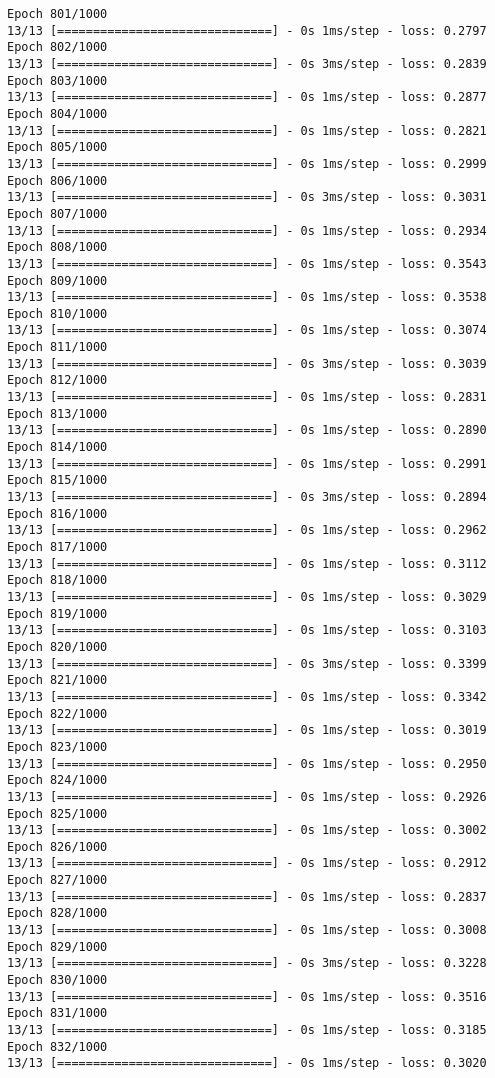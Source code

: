 \documentclass[11pt]{article}
\begin{document}
\begin{Verbatim}[commandchars=\\\{\}]
Epoch 801/1000
13/13 [==============================] - 0s 1ms/step - loss: 0.2797
Epoch 802/1000
13/13 [==============================] - 0s 3ms/step - loss: 0.2839
Epoch 803/1000
13/13 [==============================] - 0s 1ms/step - loss: 0.2877
Epoch 804/1000
13/13 [==============================] - 0s 1ms/step - loss: 0.2821
Epoch 805/1000
13/13 [==============================] - 0s 1ms/step - loss: 0.2999
Epoch 806/1000
13/13 [==============================] - 0s 3ms/step - loss: 0.3031
Epoch 807/1000
13/13 [==============================] - 0s 1ms/step - loss: 0.2934
Epoch 808/1000
13/13 [==============================] - 0s 1ms/step - loss: 0.3543
Epoch 809/1000
13/13 [==============================] - 0s 1ms/step - loss: 0.3538
Epoch 810/1000
13/13 [==============================] - 0s 1ms/step - loss: 0.3074
Epoch 811/1000
13/13 [==============================] - 0s 3ms/step - loss: 0.3039
Epoch 812/1000
13/13 [==============================] - 0s 1ms/step - loss: 0.2831
Epoch 813/1000
13/13 [==============================] - 0s 1ms/step - loss: 0.2890
Epoch 814/1000
13/13 [==============================] - 0s 1ms/step - loss: 0.2991
Epoch 815/1000
13/13 [==============================] - 0s 3ms/step - loss: 0.2894
Epoch 816/1000
13/13 [==============================] - 0s 1ms/step - loss: 0.2962
Epoch 817/1000
13/13 [==============================] - 0s 1ms/step - loss: 0.3112
Epoch 818/1000
13/13 [==============================] - 0s 1ms/step - loss: 0.3029
Epoch 819/1000
13/13 [==============================] - 0s 1ms/step - loss: 0.3103
Epoch 820/1000
13/13 [==============================] - 0s 3ms/step - loss: 0.3399
Epoch 821/1000
13/13 [==============================] - 0s 1ms/step - loss: 0.3342
Epoch 822/1000
13/13 [==============================] - 0s 1ms/step - loss: 0.3019
Epoch 823/1000
13/13 [==============================] - 0s 1ms/step - loss: 0.2950
Epoch 824/1000
13/13 [==============================] - 0s 1ms/step - loss: 0.2926
Epoch 825/1000
13/13 [==============================] - 0s 1ms/step - loss: 0.3002
Epoch 826/1000
13/13 [==============================] - 0s 1ms/step - loss: 0.2912
Epoch 827/1000
13/13 [==============================] - 0s 1ms/step - loss: 0.2837
Epoch 828/1000
13/13 [==============================] - 0s 1ms/step - loss: 0.3008
Epoch 829/1000
13/13 [==============================] - 0s 3ms/step - loss: 0.3228
Epoch 830/1000
13/13 [==============================] - 0s 1ms/step - loss: 0.3516
Epoch 831/1000
13/13 [==============================] - 0s 1ms/step - loss: 0.3185
Epoch 832/1000
13/13 [==============================] - 0s 1ms/step - loss: 0.3020

\end{Verbatim}
\end{document}
